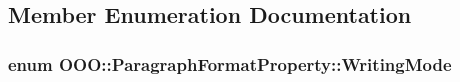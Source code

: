 \subsection{Member Enumeration Documentation}
\hypertarget{classOOO_1_1ParagraphFormatProperty_ad1278a086adbef8bae4546ffae6f7655}{
\subsubsection[{Writing\+Mode}]{\setlength{\rightskip}{0pt plus 5cm}enum {\bf O\+O\+O\+::\+Paragraph\+Format\+Property\+::\+Writing\+Mode}}}\label{classOOO_1_1ParagraphFormatProperty_ad1278a086adbef8bae4546ffae6f7655}
